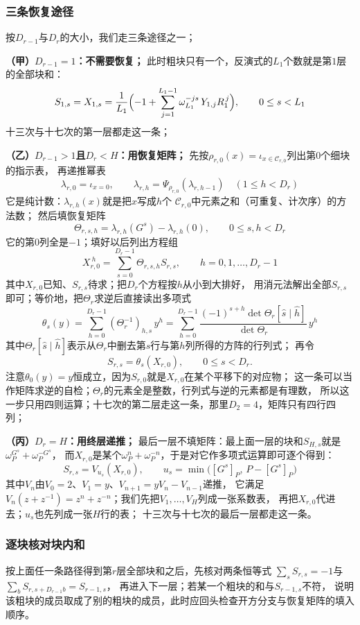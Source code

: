 \documentclass[UTF8,a4paper,11pt]{ctexart}
\begin{document}
\subsubsection{三条恢复途径}
按$D_{r-1}$与$D_r$的大小，我们走三条途径之一；

\textbf{（甲）$D_{r-1}=1$：不需要恢复；}
此时粗块只有一个，反演式的$L_1$个数就是第$1$层的全部块和：
\[
 S_{1,s}=X_{1,s}
 =\frac1{L_1}\Bigl(-1+\sum_{j=1}^{L_1-1}\omega_{L_1}^{-js}\,Y_{1,j}R_1^{\,j}\Bigr),
 \qquad 0\le s<L_1
\]
十三次与十七次的第一层都走这一条；\par

\textbf{（乙）$D_{r-1}>1$且$D_r<H$：用恢复矩阵；}
先按$\rho_{r,0}(x)=\iota_{x\in\mathscr{C}_{r,0}}$列出第$0$个细块的指示表，
再递推幂表
\[
 \lambda_{r,0}=\iota_{x=0},\qquad
 \lambda_{r,h}=\Psi_{\rho_{r,0}}(\lambda_{r,h-1})
 \quad(1\le h<D_r)
\]
它是纯计数：$\lambda_{r,h}(x)$就是把$x$写成$h$个
$\mathscr{C}_{r,0}$中元素之和（可重复、计次序）的方法数；
然后填恢复矩阵
\[
 \Theta_{r,s,h}=\lambda_{r,h}(G^s)-\lambda_{r,h}(0),
 \qquad 0\le s,h<D_r
\]
它的第$0$列全是$-1$；填好以后列出方程组
\[
 X_{r,0}^{\ h}=\sum_{s=0}^{D_r-1}\Theta_{r,s,h}S_{r,s},
 \qquad h=0,1,\dots,D_r-1
\]
其中$X_{r,0}$已知、$S_{r,s}$待求；把$D_r$个方程按$h$从小到大排好，
用消元法解出全部$S_{r,s}$即可；等价地，把$\Theta_r$求逆后直接读出多项式
\[
 \theta_s(y)=\sum_{h=0}^{D_r-1}(\Theta_r^{-1})_{h,s}\,y^{h}
 =\sum_{h=0}^{D_r-1}
 \frac{(-1)^{s+h}\det \Theta_r[\widehat s\mid\widehat h]}{\det \Theta_r}\,y^{h}
\]
其中$\Theta_r[\widehat s\mid\widehat h]$表示从$\Theta_r$中删去第$s$行与第$h$列所得的方阵的行列式；
再令
\[
 S_{r,s}=\theta_s(X_{r,0}),\qquad 0\le s<D_r.
\]
注意$\theta_0(y)=y$恒成立，因为$S_{r,0}$就是$X_{r,0}$在某个平移下的对应物；
这一条可以当作矩阵求逆的自检；$\Theta_r$的元素全是整数，行列式与逆的元素都是有理数，
所以这一步只用四则运算；十七次的第二层走这一条，那里$D_2=4$，矩阵只有四行四列；\par

\textbf{（丙）$D_r=H$：用终层递推；}
最后一层不填矩阵：最上面一层的块和$S_{H,s}$就是$\omega_P^{G^s}+\omega_P^{-G^s}$，
而$X_{r,0}$是某个$\omega_P^{n}+\omega_P^{-n}$，于是对它作多项式运算即可逐个得到：
\[
 S_{r,s}=V_{u_s}(X_{r,0}),\qquad u_s=\min\bigl([G^s]_P,\,P-[G^s]_P\bigr)
\]
其中$V_n$由$V_0=2$、$V_1=y$、$V_{n+1}=yV_n-V_{n-1}$递推，
它满足$V_n(z+z^{-1})=z^n+z^{-n}$；我们先把$V_1,\dots,V_H$列成一张系数表，
再把$X_{r,0}$代进去；$u_s$也先列成一张$H$行的表；
十三次与十七次的最后一层都走这一条。\par

\subsubsection{逐块核对块内和}
按上面任一条路径得到第$r$层全部块和之后，先核对两条恒等式
$\sum_sS_{r,s}=-1$与$\sum_bS_{r,s+D_{r-1}b}=S_{r-1,s}$，
再进入下一层；若某一个粗块的和与$S_{r-1,s}$不符，
说明该粗块的成员取成了别的粗块的成员，此时应回头检查开方分支与恢复矩阵的填入顺序。
\end{document}
